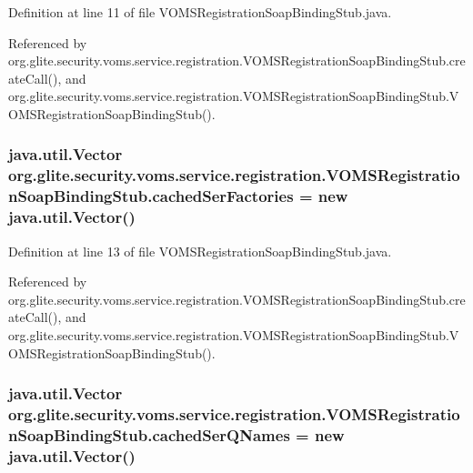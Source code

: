Definition at line 11 of file VOMSRegistrationSoapBindingStub.java.



Referenced by org.glite.security.voms.service.registration.VOMSRegistrationSoapBindingStub.createCall(), and org.glite.security.voms.service.registration.VOMSRegistrationSoapBindingStub.VOMSRegistrationSoapBindingStub().

\hypertarget{classorg_1_1glite_1_1security_1_1voms_1_1service_1_1registration_1_1VOMSRegistrationSoapBindingStub_ac4a0a6e826976bc480281b1cb5f22996}{
\subsubsection[{cachedSerFactories}]{\setlength{\rightskip}{0pt plus 5cm}java.util.Vector {\bf org.glite.security.voms.service.registration.VOMSRegistrationSoapBindingStub.cachedSerFactories} = new java.util.Vector()}}
\label{classorg_1_1glite_1_1security_1_1voms_1_1service_1_1registration_1_1VOMSRegistrationSoapBindingStub_ac4a0a6e826976bc480281b1cb5f22996}


Definition at line 13 of file VOMSRegistrationSoapBindingStub.java.



Referenced by org.glite.security.voms.service.registration.VOMSRegistrationSoapBindingStub.createCall(), and org.glite.security.voms.service.registration.VOMSRegistrationSoapBindingStub.VOMSRegistrationSoapBindingStub().

\hypertarget{classorg_1_1glite_1_1security_1_1voms_1_1service_1_1registration_1_1VOMSRegistrationSoapBindingStub_a4953a1c3677ea5b54b41eae757248ebe}{
\subsubsection[{cachedSerQNames}]{\setlength{\rightskip}{0pt plus 5cm}java.util.Vector {\bf org.glite.security.voms.service.registration.VOMSRegistrationSoapBindingStub.cachedSerQNames} = new java.util.Vector()}}
\label{classorg_1_1glite_1_1security_1_1voms_1_1service_1_1registration_1_1VOMSRegistrationSoapBindingStub_a4953a1c3677ea5b54b41eae757248ebe}


